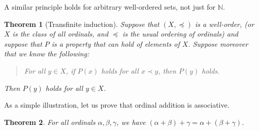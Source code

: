 \documentclass[a4paper]{memoir}
\newtheorem{theorem}{Theorem}[section]
\theoremstyle{definition}
\begin{document}
\medskip

A similar principle holds for arbitrary well-ordered sets, not just for $\mathbb{N}$.

\begin{theorem}[Transfinite induction] \label{thm: transfinite_induction}
  Suppose that $(X, \preceq)$ is a well-order, (or $X$ is the class of all ordinals, 
  and $\preceq$ is the usual ordering of ordinals) and suppose that $P$ is a property that can 
  hold of elements of $X$. Suppose moreover that we know the following:
  \begin{quote}
    For all $y \in X$, if $P(x)$ holds for all $x \prec y$, then $P(y)$ holds.
  \end{quote}
  Then $P(y)$ holds for all $y \in X$.
\end{theorem}

As a simple illustration, let us prove that ordinal addition is associative.

\begin{theorem}
  For all ordinals $\alpha,\beta,\gamma$, we have $(\alpha + \beta) + \gamma = \alpha + (\beta + \gamma)$.
\end{theorem}
\end{document}
